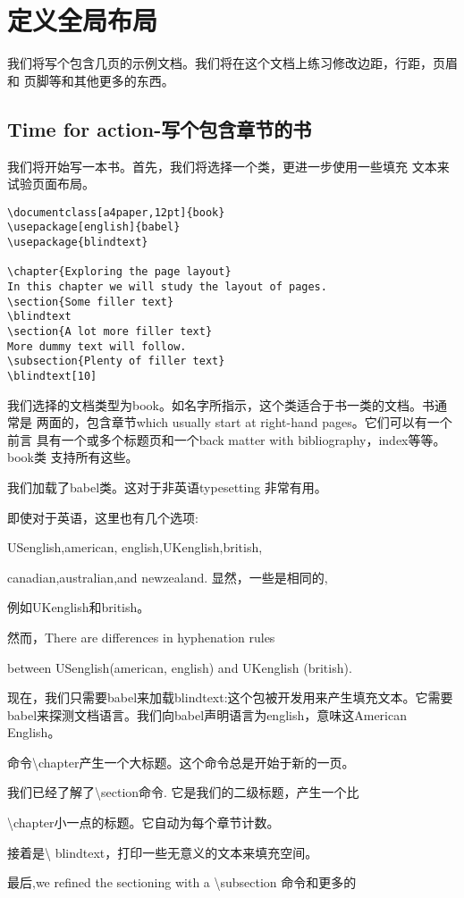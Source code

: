 \section{定义全局布局}
我们将写个包含几页的示例文档。我们将在这个文档上练习修改边距，行距，页眉和
页脚等和其他更多的东西。
	\subsection{Time for action-写个包含章节的书}
我们将开始写一本书。首先，我们将选择一个类，更进一步使用一些填充
文本来试验页面布局。
\begin{lstlisting}[language={[LaTeX]TeX}]
\documentclass[a4paper,12pt]{book}
\usepackage[english]{babel}
\usepackage{blindtext}

\chapter{Exploring the page layout}
In this chapter we will study the layout of pages.
\section{Some filler text}
\blindtext
\section{A lot more filler text}
More dummy text will follow.
\subsection{Plenty of filler text}
\blindtext[10]

\end{lstlisting}
我们选择的文档类型为book。如名字所指示，这个类适合于书一类的文档。书通常是
两面的，包含章节which usually start at right-hand pages。它们可以有一个前言
具有一个或多个标题页和一个back matter with bibliography，index等等。book类
支持所有这些。

我们加载了babel类。这对于非英语typesetting 非常有用。

即使对于英语，这里也有几个选项:

USenglish,american,
english,UKenglish,british,

canadian,australian,and newzealand.
显然，一些是相同的,

例如UKenglish和british。

然而，There are differences in hyphenation rules

between USenglish(american,
english) and UKenglish (british).

现在，我们只需要babel来加载blindtext:这个包被开发用来产生填充文本。它需要
babel来探测文档语言。我们向babel声明语言为english，意味这American English。

命令\textbackslash chapter产生一个大标题。这个命令总是开始于新的一页。

我们已经了解了\textbackslash section命令.
它是我们的二级标题，产生一个比

\textbackslash chapter小一点的标题。它自动为每个章节计数。

接着是\textbackslash
 blindtext，打印一些无意义的文本来填充空间。

最后,we refined the sectioning with a \textbackslash subsection 命令和更多的

